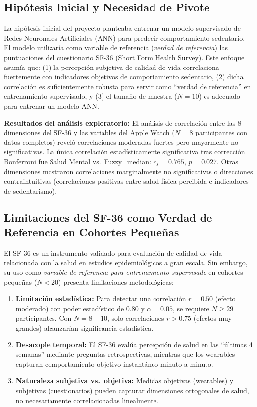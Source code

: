 \subsection{Hipótesis Inicial y Necesidad de Pivote}
\label{subsec:hipotesis_inicial_pivote}

La hipótesis inicial del proyecto planteaba entrenar un modelo supervisado de Redes Neuronales Artificiales (ANN) para predecir comportamiento sedentario. El modelo utilizaría como variable de referencia (\textit{verdad de referencia}) las puntuaciones del cuestionario SF-36 (Short Form Health Survey). Este enfoque asumía que: (1) la percepción subjetiva de calidad de vida correlaciona fuertemente con indicadores objetivos de comportamiento sedentario, (2) dicha correlación es suficientemente robusta para servir como ``verdad de referencia'' en entrenamiento supervisado, y (3) el tamaño de muestra ($N=10$) es adecuado para entrenar un modelo ANN.

\textbf{Resultados del análisis exploratorio:} El análisis de correlación entre las 8 dimensiones del SF-36 y las variables del Apple Watch ($N=8$ participantes con datos completos) reveló correlaciones moderadas-fuertes pero mayormente no significativas. La única correlación estadísticamente significativa tras corrección Bonferroni fue Salud Mental vs.\ Fuzzy\_median: $r_s = 0.765$, $p = 0.027$. Otras dimensiones mostraron correlaciones marginalmente no significativas o direcciones contraintuitivas (correlaciones positivas entre salud física percibida e indicadores de sedentarismo).

\subsection{Limitaciones del SF-36 como Verdad de Referencia en Cohortes Pequeñas}
\label{subsec:limitaciones_sf36}

El SF-36 es un instrumento validado para evaluación de calidad de vida relacionada con la salud en estudios epidemiológicos a gran escala. Sin embargo, su uso como \textit{variable de referencia para entrenamiento supervisado} en cohortes pequeñas ($N < 20$) presenta limitaciones metodológicas:

\begin{enumerate}
    \item \textbf{Limitación estadística:} Para detectar una correlación $r = 0.50$ (efecto moderado) con poder estadístico de 0.80 y $\alpha = 0.05$, se requiere $N \geq 29$ participantes. Con $N=8-10$, solo correlaciones $r > 0.75$ (efectos muy grandes) alcanzarían significancia estadística.
    
    \item \textbf{Desacople temporal:} El SF-36 evalúa percepción de salud en las ``últimas 4 semanas'' mediante preguntas retrospectivas, mientras que los wearables capturan comportamiento objetivo instantáneo minuto a minuto.
    
    \item \textbf{Naturaleza subjetiva vs.\ objetiva:} Medidas objetivas (wearables) y subjetivas (cuestionarios) pueden capturar dimensiones ortogonales de salud, no necesariamente correlacionadas linealmente.
\end{enumerate}

